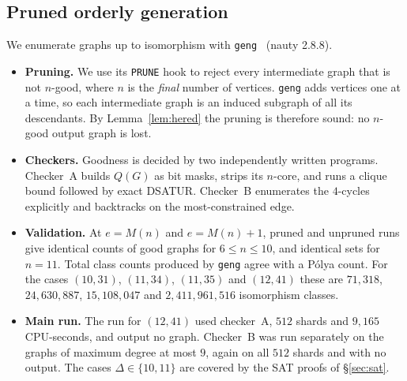 \documentclass[11pt]{amsart}
\theoremstyle{definition}
\newcommand{\M}{M}
\begin{document}
\subsection{Pruned orderly generation}\label{sec:enum}
We enumerate graphs up to isomorphism with \texttt{geng}~\cite{nauty} (nauty 2.8.8).
\begin{itemize}
\item \textbf{Pruning.} We use its \texttt{PRUNE} hook to reject every intermediate graph
  that is not $n$-good, where $n$ is the \emph{final} number of vertices. \texttt{geng} adds
  vertices one at a time, so each intermediate graph is an induced subgraph of all its
  descendants. By Lemma~\ref{lem:hered} the pruning is therefore sound: no $n$-good output
  graph is lost.
\item \textbf{Checkers.} Goodness is decided by two independently written programs.
  Checker~A builds $Q(G)$ as bit masks, strips its $n$-core, and runs a clique bound followed
  by exact DSATUR. Checker~B enumerates the $4$-cycles explicitly and backtracks on the
  most-constrained edge.
\item \textbf{Validation.} At $e=\M(n)$ and $e=\M(n)+1$, pruned and unpruned runs give
  identical counts of good graphs for $6\le n\le 10$, and identical sets for $n=11$. Total
  class counts produced by \texttt{geng} agree with a P\'olya count. For the cases
  $(10,31)$, $(11,34)$, $(11,35)$ and $(12,41)$ these are $71{,}318$, $24{,}630{,}887$,
  $15{,}108{,}047$ and $2{,}411{,}961{,}516$ isomorphism classes.
\item \textbf{Main run.} The run for $(12,41)$ used checker~A, $512$ shards and $9{,}165$
  CPU-seconds, and output no graph. Checker~B was run separately on the graphs of maximum
  degree at most $9$, again on all $512$ shards and with no output. The cases
  $\Delta\in\{10,11\}$ are covered by the SAT proofs of \S\ref{sec:sat}.
\end{itemize}
\end{document}
